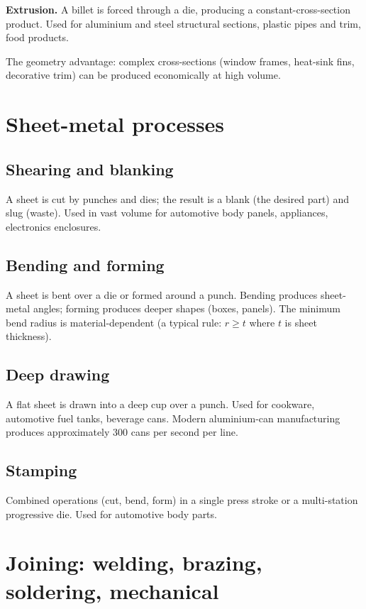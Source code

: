 \textbf{Extrusion.} A billet is forced through a die, producing a constant-cross-section product. Used for aluminium and steel structural sections, plastic pipes and trim, food products.

The geometry advantage: complex cross-sections (window frames, heat-sink fins, decorative trim) can be produced economically at high volume.

\section{Sheet-metal processes}

\subsection{Shearing and blanking}

A sheet is cut by punches and dies; the result is a blank (the desired part) and slug (waste). Used in vast volume for automotive body panels, appliances, electronics enclosures.

\subsection{Bending and forming}

A sheet is bent over a die or formed around a punch. Bending produces sheet-metal angles; forming produces deeper shapes (boxes, panels). The minimum bend radius is material-dependent (a typical rule: $r \geq t$ where $t$ is sheet thickness).

\subsection{Deep drawing}

A flat sheet is drawn into a deep cup over a punch. Used for cookware, automotive fuel tanks, beverage cans. Modern aluminium-can manufacturing produces approximately 300 cans per second per line.

\subsection{Stamping}

Combined operations (cut, bend, form) in a single press stroke or a multi-station progressive die. Used for automotive body parts.

\section{Joining: welding, brazing, soldering, mechanical}

